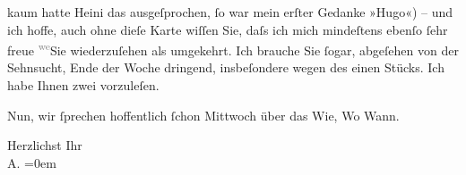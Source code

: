                kaum hatte Heini das ausgeſprochen, ſo war
               mein erſter Gedanke »Hugo«) – und ich hoffe, auch ohne dieſe Karte {\pb}wiſſen Sie, daſs ich mich mindeſtens ebenſo ſehr freue \substVorne{}\textsuperscript{\textcolor{gray}{we{\geminationn}}}\substDazwischen{}Sie\substHinten{} wiederzuſehen als umgekehrt. Ich brauche Sie ſogar, abgeſehen von der
               Sehnsucht, Ende der Woche dringend, insbeſondere wegen des einen Stücks. Ich habe Ihnen zwei vorzuleſen.\pend
           
\pstart
           Nun, wir ſprechen hoffentlich ſchon Mittwoch über das Wie, Wo Wann.\pend
           
\pstart
           Herzlichst Ihr{\\[\baselineskip]}\spacefill\mbox{A.}\pend
           \leftskip=0em{}\endnumbering{}  
      